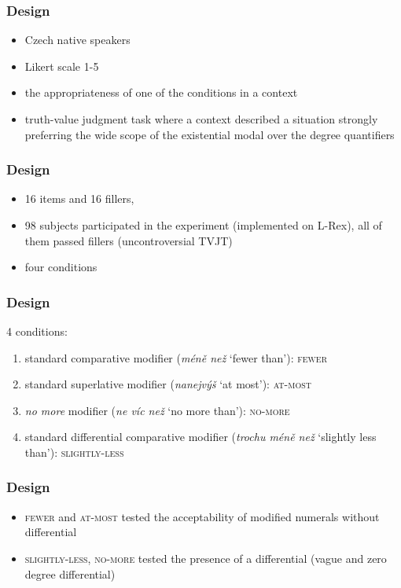 \documentclass[10pt
]{beamer}
\newcommand{\cond}[1]{\textsc{#1}}
\begin{document}
\begin{frame}
  \frametitle{Design}

  \begin{itemize}
    \item Czech native speakers 
    \item Likert scale 1-5
    \item  the appropriateness of one of the conditions in a context
    \item truth-value judgment task where a context described a situation strongly preferring the wide scope of the existential modal over the degree quantifiers
  \end{itemize}
\end{frame}

\begin{frame}
  \frametitle{Design}

\begin{itemize}
    \item 16 items and 16 fillers,
    \item 98 subjects participated in the experiment (implemented on L-Rex), all of them passed fillers (uncontroversial TVJT)
    \item four conditions
  \end{itemize}
  

\end{frame}

\begin{frame}
  \frametitle{Design}

4 conditions:

\begin{enumerate}
  \item standard comparative modifier (\textit{méně než} `fewer than'): \cond{fewer}
  \item standard superlative modifier (\textit{nanejvýš} `at most'):  \cond{at-most}
  \item \textit{no more} modifier (\textit{ne víc než} `no more than'): \cond{no-more}
  \item standard differential comparative modifier (\textit{trochu méně než} `slightly less than'): \cond{slightly-less}
\end{enumerate}

\end{frame}

\begin{frame}
  \frametitle{Design}

  \begin{itemize}
    \item \cond{fewer} and \cond{at-most} tested the acceptability of modified numerals without differential
    \item \cond{slightly-less}, \cond{no-more} tested the presence of a differential (vague and zero degree differential)
  \end{itemize}
  
\end{frame}
\end{document}
